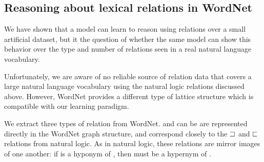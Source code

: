\subsection*{Reasoning about lexical relations in WordNet}\label{sec:wordnet}


We have shown that a model can learn to reason using relations over a small artificial dataset, 
but it the question of whether the same model can show this behavior over the type and number of
relations seen in a real natural language vocabulary.

Unfortunately, we are aware of no reliable source of relation data that covers a large natural 
language vocabulary using the natural logic relations discussed above. However, WordNet 
\cite{fellbaum2010wordnet} provides a different type of lattice structure which is compatible with
our learning paradigm.

We extract three types of relation from WordNet.  and  can be are represented
directly in the WordNet graph structure, and correspond closely to the $\sqsupset$ and $\sqsubset$ relations from
natural logic. As in natural logic, these relations are mirror images of one another: if  is a
hyponym of , then  must be a hypernym of . 





